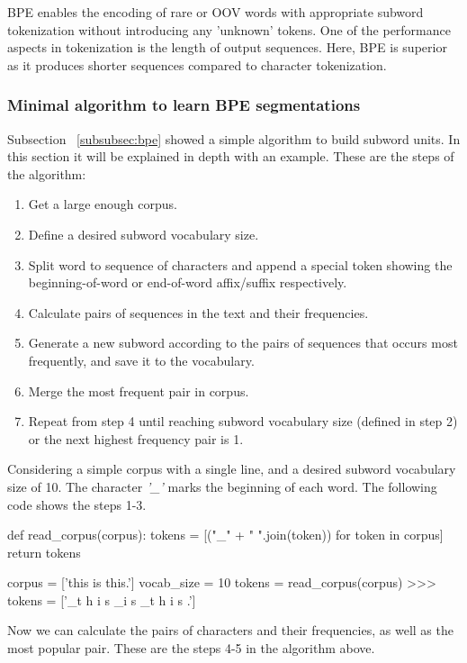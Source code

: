 BPE enables the encoding of rare or OOV words with appropriate subword tokenization without introducing any 'unknown' tokens. One of the performance aspects in tokenization is the length of output sequences. Here, BPE is superior as it produces shorter sequences compared to character tokenization.

\subsubsection{Minimal algorithm to learn BPE segmentations}

Subsection ~\ref{subsubsec:bpe} showed a simple algorithm to build subword units. In this section it will be explained in depth with an example. These are the steps of the algorithm:

\begin{enumerate}
    \item Get a large enough corpus.
    \item Define a desired subword vocabulary size.
    \item Split word to sequence of characters and append a special token showing the beginning-of-word or end-of-word affix/suffix respectively.
    \item Calculate pairs of sequences in the text and their frequencies.
    \item Generate a new subword according to the pairs of sequences that occurs most frequently, and save it to the vocabulary.
    \item Merge the most frequent pair in corpus.
    \item Repeat from step 4 until reaching subword vocabulary size (defined in step 2) or the next highest frequency pair is 1.
\end{enumerate}

Considering a simple corpus with a single line, and a desired subword vocabulary size of 10. The character \emph{'\_'} marks the beginning of each word. The following code shows the steps 1-3.

\begin{python}
def read_corpus(corpus):
    tokens = [("_" + " ".join(token)) for token in corpus]
    return tokens

corpus = ['this is this.']
vocab_size = 10
tokens = read_corpus(corpus)
>>> tokens = ['_t h i s _i s _t h i s .']
\end{python}

Now we can calculate the pairs of characters and their frequencies, as well as the most popular pair. These are the steps 4-5 in the algorithm above.

